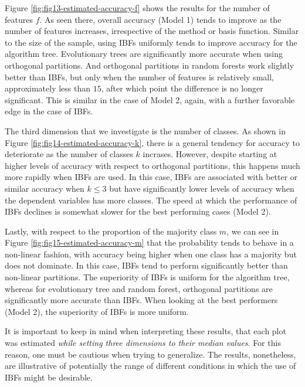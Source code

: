 \documentclass[]{elsarticle} %
\begin{document}
Figure \ref{fig:fig13-estimated-accuracy-f} shows the results for the
number of features \(f\). As seen there, overall accuracy (Model 1)
tends to improve as the number of features increases, irrespective of
the method or basis function. Similar to the size of the sample, using
IBFs uniformly tends to improve accuracy for the algorithm tree.
Evolutionary trees are significantly more accurate when using orthogonal
partitions. And orthogonal partitions in random forests work slightly
better than IBFs, but only when the number of features is relatively
small, approximately less than \(15\), after which point the difference
is no longer significant. This is similar in the case of Model 2, again,
with a further favorable edge in the case of IBFs.

The third dimension that we investigate is the number of classes. As
shown in Figure \ref{fig:fig14-estimated-accuracy-k}, there is a general
tendency for accuracy to deteriorate as the number of classes \(k\)
incrases. However, despite starting at higher levels of accuracy with
respect to orthogonal partitions, this happens much more rapidly when
IBFs are used. In this case, IBFs are associated with better or similar
accuracy when \(k\leq3\) but have significantly lower levels of accuracy
when the dependent variables has more classes. The speed at which the
performance of IBFs declines is somewhat slower for the best performing
cases (Model 2).

Lastly, with respect to the proportion of the majority class \(m\), we
can see in Figure \ref{fig:fig15-estimated-accuracy-m} that the
probability tends to behave in a non-linear fashion, with accuracy being
higher when one class has a majority but does not dominate. In this
case, IBFs tend to perform significantly better than non-linear
partitions. The superiority of IBFs is uniform for the algorithm tree,
whereas for evolutionary tree and random forest, orthogonal partitions
are significantly more accurate than IBFs. When looking at the best
performers (Model 2), the superiority of IBFs is more uniform.

It is important to keep in mind when interpreting these results, that
each plot was estimated \emph{while setting three dimensions to their
median values}. For this reason, one must be cautious when trying to
generalize. The results, nonetheless, are illustrative of potentially
the range of different conditions in which the use of IBFs might be
desirable.
\end{document}
